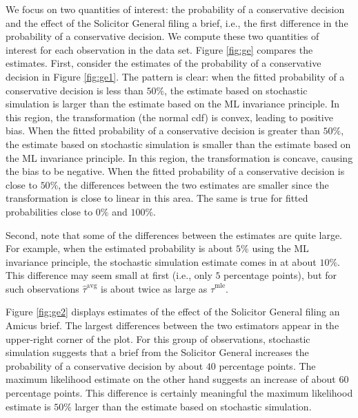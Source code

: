 \documentclass[11pt]{article}
\begin{document}
We focus on two quantities of interest: the probability of a conservative decision and the effect of the Solicitor General filing a brief, i.e., the first difference in the probability of a conservative decision. We compute these two quantities of interest for each observation in the data set. Figure \ref{fig:ge} compares the estimates.
First, consider the estimates of the probability of a conservative decision in  Figure \ref{fig:ge1}. The pattern is clear: when the fitted probability of a conservative decision is less than $50\%$, the estimate based on stochastic simulation is larger than the estimate based on the ML invariance principle. In this region, the transformation (the normal cdf) is convex, leading to positive bias. When the fitted probability of a conservative decision is greater than $50\%$, the estimate based on stochastic simulation is smaller than the estimate based on the ML invariance principle. In this region, the transformation is concave, causing the bias to be negative. When the fitted  probability of a conservative decision is close to $50\%$, the differences between the two estimates are smaller since the transformation is close to linear in this area. The same is true for fitted probabilities close to $0\%$ and $100\%$.

Second, note that some of the differences between the estimates are quite large.
For example, when the estimated probability is about $5\%$ using the ML invariance principle, the stochastic simulation estimate comes in at about $10\%$. This difference may seem small at first (i.e., only $5$ percentage points), but for such observations $\hat{\tau}^\text{avg}$ is about twice as large as $\hat{\tau}^\text{mle}$.


Figure \ref{fig:ge2} displays estimates of the effect of the Solicitor General filing an Amicus brief. The largest differences between the two estimators appear in the upper-right corner of the plot. For this group of observations, stochastic simulation suggests that a brief from the Solicitor General increases the probability of a conservative decision by about $40$ percentage points. The maximum likelihood estimate on the other hand suggests an increase of about $60$ percentage points. This difference is certainly meaningful \textemdash{} the maximum likelihood estimate is $50\%$ larger than the estimate based on stochastic simulation.


\end{document}
